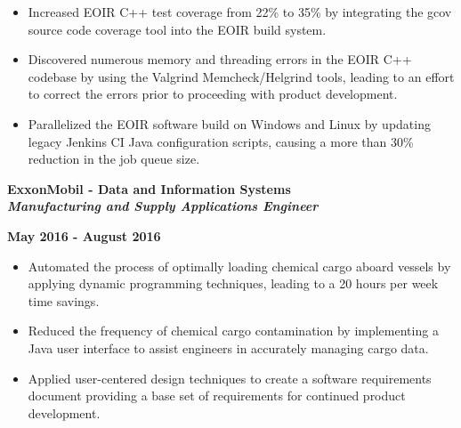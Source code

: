 \documentclass[10pt,letterpaper]{article}
\begin{document}
\begin{itemize}[noitemsep,topsep=0pt]
        \setlength\itemsep{-0.10em}
        \item Increased EOIR C++ test coverage from 22\% to 35\% by integrating the gcov
              source code coverage tool into the EOIR build system.
        \item Discovered numerous memory and threading errors in the EOIR C++ codebase
              by using the Valgrind Memcheck/Helgrind tools, leading to an effort to correct
              the errors prior to proceeding with product development.
        \item Parallelized the EOIR software build on Windows and Linux by updating legacy Jenkins
              CI Java configuration scripts, causing a more than 30\% reduction in the job
              queue size.
\end{itemize}

\medskip

\begin{minipage}[t]{0.53\textwidth}
        \begin{flushleft}
                \textbf{ExxonMobil - Data and Information Systems}\\
                \textbf{\textit{Manufacturing and Supply Applications Engineer}}\\
        \end{flushleft}
\end{minipage}
\begin{minipage}[t]{0.44\textwidth}
        \begin{flushright}
                \textbf{May 2016 - August 2016}
        \end{flushright}
\end{minipage}

\begin{itemize}[noitemsep,topsep=0pt]
        \setlength\itemsep{-0.10em}
        \item Automated the process of optimally loading chemical cargo aboard
              vessels by applying dynamic programming techniques, leading to a 20
              hours per week time savings.
        \item Reduced the frequency of chemical cargo contamination by implementing
              a Java user interface to assist engineers in accurately managing cargo data.
        \item Applied user-centered design techniques to create a software
              requirements document providing a base set of requirements for continued
              product development.
\end{itemize}
\end{document}
